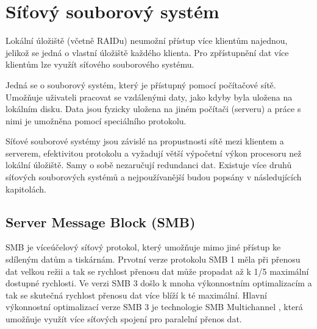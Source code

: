 \documentclass[czech,DP]{thesiskiv}
\begin{document}



\section{Síťový souborový systém}

Lokální úložiště (včetně RAIDu) neumožní přístup více klientům najednou, jelikož se jedná o vlastní úložiště každého klienta. Pro zpřístupnění dat více klientům lze využít síťového souborového systému. 

Jedná se o souborový systém, který je přístupný pomocí počítačové sítě. Umožňuje uživateli pracovat se vzdálenými daty, jako kdyby byla uložena na lokálním disku. Data jsou fyzicky uložena na jiném počítači (serveru) a práce s nimi je umožněna pomocí speciálního protokolu.

Síťové souborové systémy jsou závislé na propustnosti sítě mezi klientem a serverem, efektivitou protokolu a vyžadují větší výpočetní výkon procesoru než lokální úložiště. Samy o sobě nezaručují redundanci dat. Existuje více druhů síťových souborových systémů a nejpoužívanější budou popsány v následujících kapitolách.

\subsection{Server Message Block (SMB)}

SMB \cite{smbpaper} je víceúčelový síťový protokol, který umožňuje mimo jiné přístup ke sdíleným datům a tiskárnám. Prvotní verze protokolu SMB 1 měla při přenosu dat velkou režii a tak se rychlost přenosu dat může propadat až k 1/5 maximální dostupné rychlosti. Ve verzi SMB 3 došlo k mnoha výkonnostním optimalizacím a tak se skutečná rychlost přenosu dat více blíží k té maximální. Hlavní výkonnostní optimalizací verze SMB 3 je technologie SMB Multichannel \cite{smbmultichannelonline}, která umožňuje využít více síťových spojení pro paralelní přenos dat.
\end{document}
